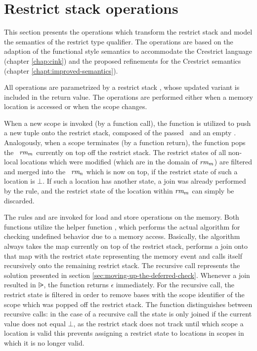 \newpage

\section{Restrict stack operations}\label{section:restrict-operations}
This section presents the operations which transform the restrict stack and model the semantics of the restrict type qualifier.
The operations are based on the adaption of the functional style \cink{} semantics to accommodate the
Crestrict language (chapter \ref{chap:cink}) and the proposed refinements for the Crestrict semantics (chapter \ref{chapt:improved-semantics}).

All operations are parametrized by a restrict stack \Restrictstackvar, whose updated variant is included in the return value.
The operations are performed either when a memory location is accessed or when the scope changes.

When a new scope is invoked (by a function call), the  function is utilized to push a new tuple onto the restrict stack, 
composed of the passed \Scopeid \ and an empty \Restrictmap. Analogously, when a scope terminates (by a function return),
the function  pops the \Restrictmap \ $\textit{rm}_m$ currently on top off the restrict stack.
The restrict states of all non-local locations which were modified (\ie which are in the domain of $\textit{rm}_m$)
are filtered and merged into the \Restrictmap \ $\textit{rm}_n$ which is now on top, if the restrict state of such a location is $\bot$.
If such a location has another state, a join was already performed by the  rule, and the restrict state of the location within $\textit{rm}_m$ can simply be discarded.

The rules  and  are invoked for load and store operations on the memory.
Both functions utilize the helper function , which performs the actual algorithm for checking undefined behavior
due to a memory access.
Basically, the algorithm always takes the map currently on top of the restrict stack, performs a join onto that map
with the restrict state representing the memory event and calls itself recursively onto the remaining restrict stack.
The recursive call represents the solution presented in section \ref{sec:moving-up-the-deferred-check}.
Whenever a join resulted in $\rsub$, the function returns $\epsilon$ immediately.
For the recursive call, the restrict state is filtered in order to remove bases with the scope identifier of the
scope which was popped off the restrict stack.
The function distinguishes between recursive calls: in the case of a recursive call the 
state is only joined if the current value does not equal $\bot$, as the restrict stack does not track until which scope 
a location is valid this prevents assigning a restrict state to locations in scopes in which it is no longer valid.

